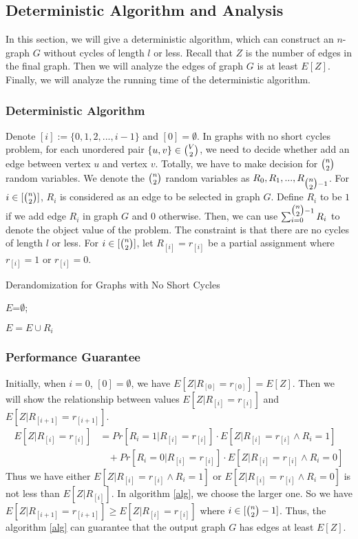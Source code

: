 \subsection{Deterministic Algorithm and Analysis}
In this section, we will give a deterministic algorithm, which can construct an $n$-graph $G$ without cycles of length $l$ or less. 
Recall that $Z$ is the number of edges in the final graph.
Then we will analyze the edges of graph $G$ is at least $E[Z]$. 
Finally, we will analyze the running time of the deterministic algorithm.
\subsubsection{Deterministic Algorithm}
Denote $[i]:=\{0,1,2,...,i-1\}$ and $[0]=\emptyset$.
In graphs with no short cycles problem, for each unordered pair $\{u, v\} \in \tbinom{V}{2}$, we need to decide whether add an edge between vertex $u$ and vertex $v$. 
Totally, we have to make decision for $\tbinom{n}{2}$ random variables.
We denote the $\tbinom{n}{2}$ random variables as $R_0, R_1, ..., R_{\tbinom{n}{2}-1}$. %
For $i\in [\tbinom{n}{2}]$, $R_i$ is considered as an edge to be selected in graph $G$.
Define $R_i$ to be $1$ if we add edge $R_i$ in graph $G$ and $0$ otherwise. 
Then, we can use $\sum_{i=0}^{\tbinom{n}{2}-1}R_i$ to denote the object value of the problem. The constraint is that there are no cycles of length $l$ or less.
For $i\in [\tbinom{n}{2}]$, let $R_{[i]}=r_{[i]}$ be a partial assignment where $r_{[i]}=1$ or $r_{[i]}=0$.
\begin{algorithm}
    \caption{Derandomization for Graphs with No Short Cycles}\label{alg}
    {
        $E$=$\emptyset$;

        {
            {
               $ E=E\cup R_i$
            }
        
        }
    }
\end{algorithm}
\subsubsection{Performance Guarantee}

Initially, when $i=0$, $[0]=\emptyset$, we have $E[Z|R_{[0]}=r_{[0]}]=E[Z]$.
Then we will show the relationship between values $E[Z|R_{[i]}=r_{[i]}]$ and  $E[Z|R_{[i+1]}=r_{[i+1]}]$. 
\begin{align}
    \nonumber E[Z|R_{[i]}=r_{[i]}]&=Pr[R_i=1|R_{[i]}=r_{[i]}]\cdot E[Z|R_{[i]}=r_{[i]}\wedge R_i=1]\\
    \nonumber &~~~~+Pr[R_i=0|R_{[i]}=r_{[i]}]\cdot E[Z|R_{[i]}=r_{[i]}\wedge R_i=0]
\end{align}
Thus we have either $E[Z|R_{[i]}=r_{[i]}\wedge R_i=1]$ or $E[Z|R_{[i]}=r_{[i]}\wedge R_i=0]$ is not less than  $E[Z|R_{[i]}] $. In algorithm \ref{alg}, we choose the larger one. So we have $E[Z|R_{[i+1]}=r_{[i+1]}] \ge E[Z|R_{[i]}=r_{[i]}]$ where $i\in [\tbinom{n}{2}-1]$.
Thus, the algorithm \ref{alg} can guarantee that the output graph $G$ has edges at least $E[Z]$.
